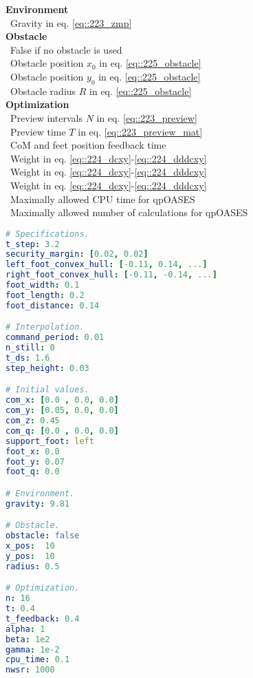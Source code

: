 \begin{minipage}[t]{1.\textwidth}
\begin{minipage}{0.5\textwidth}
{			\hfill \textbf{Environment}\\
			\mbox{}~\hfill Gravity in eq. \ref{eq::223_zmp}\\
			
			\hfill \textbf{Obstacle}\\
			\mbox{}~\hfill False if no obstacle is used\\
			\mbox{}~\hfill Obstacle position $x_0$ in eq. \ref{eq::225_obstacle}\\
			\mbox{}~\hfill Obstacle position $y_0$ in eq. \ref{eq::225_obstacle}\\
			\mbox{}~\hfill Obstacle radius $R$ in eq. \ref{eq::225_obstacle}\\
			
			\hfill \textbf{Optimization}\\
			\mbox{}~\hfill Preview intervals $N$ in eq. \ref{eq::223_preview}\\
			\mbox{}~\hfill Preview time $T$ in eq. \ref{eq::223_preview_mat}\\
			\mbox{}~\hfill CoM and feet position feedback time\\
			\mbox{}~\hfill Weight in eq. \ref{eq::224_dcxy}-\ref{eq::224_dddcxy}\\
			\mbox{}~\hfill Weight in eq. \ref{eq::224_dcxy}-\ref{eq::224_dddcxy}\\
			\mbox{}~\hfill Weight in eq. \ref{eq::224_dcxy}-\ref{eq::224_dddcxy}\\
			\mbox{}~\hfill Maximally allowed CPU time for qpOASES\\
			\mbox{}~\hfill Maximally allowed number of calculations for qpOASES}
	\end{minipage}
	\begin{minipage}{0.5\textwidth}
		\begin{lstlisting}[language=yaml]
# Specifications.
t_step: 3.2
security_margin: [0.02, 0.02]
left_foot_convex_hull: [-0.11, 0.14, ...]
right_foot_convex_hull: [-0.11, -0.14, ...]
foot_width: 0.1
foot_length: 0.2
foot_distance: 0.14

# Interpolation.
command_period: 0.01
n_still: 0
t_ds: 1.6
step_height: 0.03

# Initial values.
com_x: [0.0 , 0.0, 0.0]
com_y: [0.05, 0.0, 0.0]
com_z: 0.45
com_q: [0.0 , 0.0, 0.0]
support_foot: left
foot_x: 0.0
foot_y: 0.07
foot_q: 0.0

# Environment.
gravity: 9.81

# Obstacle.
obstacle: false
x_pos:  10
y_pos:  10
radius: 0.5

# Optimization.
n: 16
t: 0.4
t_feedback: 0.4
alpha: 1
beta: 1e2
gamma: 1e-2
cpu_time: 0.1
nwsr: 1000
		\end{lstlisting}
	\end{minipage}
	\label{sec::63_us_conf}
\end{minipage}

